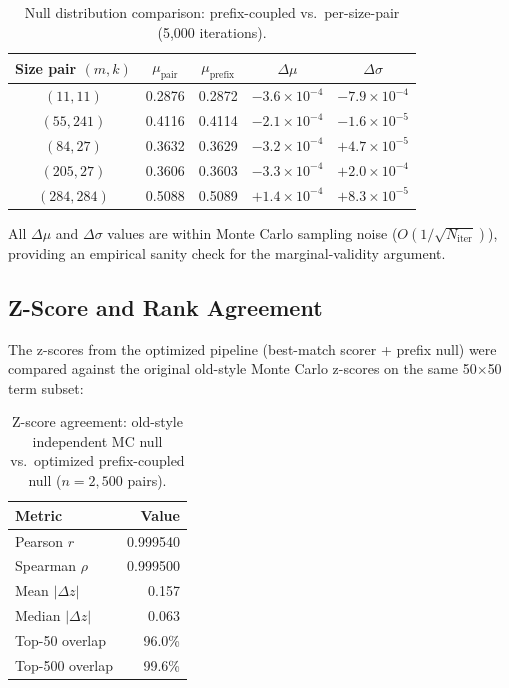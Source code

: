 \documentclass[11pt,a4paper]{article}
\begin{document}
\begin{table}[H]
	\centering
	\caption{Null distribution comparison: prefix-coupled vs.\ per-size-pair
			(5{,}000 iterations).}
	\smallskip
	\small
	\begin{tabular}{@{}ccccc@{}}
		\toprule
		Size pair $(m,k)$ & $\mu_\text{pair}$ & $\mu_\text{prefix}$ &
		$\Delta\mu$       & $\Delta\sigma$                                                                          \\
		\midrule
		$(11, 11)$        & 0.2876            & 0.2872              & $-3.6 \times 10^{-4}$ & $-7.9 \times 10^{-4}$ \\
		$(55, 241)$       & 0.4116            & 0.4114              & $-2.1 \times 10^{-4}$ & $-1.6 \times 10^{-5}$ \\
		$(84, 27)$        & 0.3632            & 0.3629              & $-3.2 \times 10^{-4}$ & $+4.7 \times 10^{-5}$ \\
		$(205, 27)$       & 0.3606            & 0.3603              & $-3.3 \times 10^{-4}$ & $+2.0 \times 10^{-4}$ \\
		$(284, 284)$      & 0.5088            & 0.5089              & $+1.4 \times 10^{-4}$ & $+8.3 \times 10^{-5}$ \\
		\bottomrule
	\end{tabular}
\end{table}

All $\Delta\mu$ and $\Delta\sigma$ values are within Monte Carlo sampling
noise ($O(1/\sqrt{N_\text{iter}})$), providing an empirical sanity check for
the marginal-validity argument.

\subsection{Z-Score and Rank Agreement}

The z-scores from the optimized pipeline (best-match scorer + prefix null)
were compared against the original old-style Monte Carlo z-scores on the same
50$\times$50 term subset:

\begin{table}[H]
	\centering
	\caption{Z-score agreement: old-style independent MC null vs.\ optimized
		prefix-coupled null ($n = 2{,}500$ pairs).}
	\smallskip
	\begin{tabular}{@{}lr@{}}
		\toprule
		Metric              & Value    \\
		\midrule
		Pearson $r$         & 0.999540 \\
		Spearman $\rho$     & 0.999500 \\
		Mean $|\Delta z|$   & 0.157    \\
		Median $|\Delta z|$ & 0.063    \\
		Top-50 overlap      & 96.0\%   \\
		Top-500 overlap     & 99.6\%   \\
		\bottomrule
	\end{tabular}
\end{table}
\end{document}
